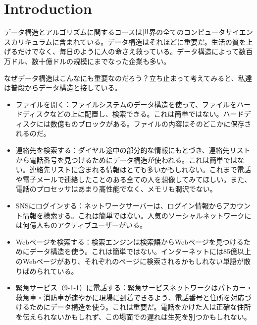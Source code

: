 \chapter{Introduction}

データ構造とアルゴリズムに関するコースは世界の全てのコンピュータサイエンスカリキュラムに含まれている。データ構造はそれほどに重要だ。生活の質を上げるだけでなく、毎日のように人の命さえ救っている。データ構造によって数百万ドル、数十億ドルの規模にまでなった企業も多い。

なぜデータ構造はこんなにも重要なのだろう？立ち止まって考えてみると、私達は普段からデータ構造と接している。

\begin{itemize}
	\item ファイルを開く：ファイルシステムのデータ構造を使って、ファイルをハードディスクなどの上に配置し、検索できる。これは簡単ではない。ハードディスクには数億ものブロックがある。ファイルの内容はそのどこかに保存されるのだ。
	\item 連絡先を検索する：ダイヤル途中の部分的な情報にもとづき、連絡先リストから電話番号を見つけるためにデータ構造が使われる。これは簡単ではない。連絡先リストに含まれる情報はとても多いかもしれない。これまで電話や電子メールで連絡したことのある全ての人を想像してみてほしい。また、電話のプロセッサはあまり高性能でなく、メモリも潤沢でない。
	\item SNSにログインする：ネットワークサーバーは、ログイン情報からアカウント情報を検索する。これは簡単ではない。人気のソーシャルネットワークには何億人ものアクティブユーザーがいる。
	\item Webページを検索する：検索エンジンは検索語からWebページを見つけるためにデータ構造を使う。これは簡単ではない。インターネットには85億以上のWebページがあり、それぞれのページに検索されるかもしれない単語が散りばめられている。
	\item 緊急サービス（9-1-1）に電話する：緊急サービスネットワークはパトカー・救急車・消防車が速やかに現場に到着できるよう、電話番号と住所を対応づけるためにデータ構造を使う。これは重要だ。電話をかけた人は正確な住所を伝えられないかもしれず、この場面での遅れは生死を別つかもしれない。
\end{itemize}

